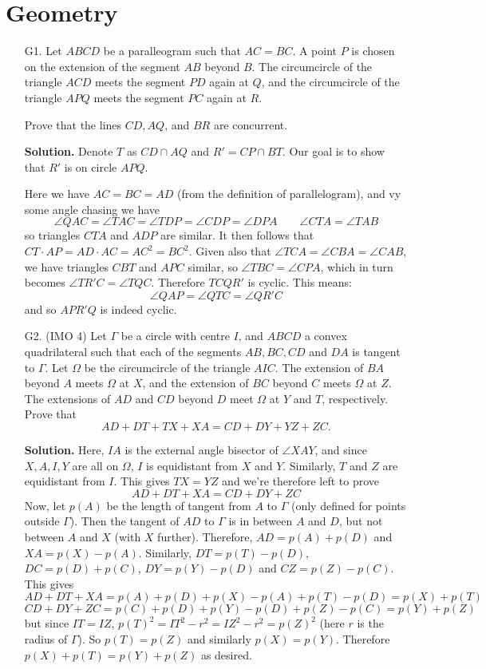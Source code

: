 \documentclass[11pt,a4paper]{article}
\begin{document}
	
	\section*{Geometry}
	\begin{enumerate}
		\item [G1.]  Let $ABCD$ be a paralleogram such that $AC = BC$. A point $P$ is chosen on the extension of the segment $AB$ beyond $B$. 
		The circumcircle of the triangle $ACD$ meets the segment $PD$ again at $Q$, and the circumcircle of the triangle $APQ$ meets the segment $PC$ again at $R$.
		
		Prove that the lines $CD, AQ$, and $BR$ are concurrent.
		
		\textbf{Solution.} 
		Denote $T$ as $CD\cap AQ$ and $R'=CP\cap BT$. Our goal is to show that $R'$ is on circle $APQ$. 
		 
		Here we have $AC=BC=AD$ (from the definition of parallelogram), and vy some angle chasing we have 
		\[
		\angle QAC = \angle TAC = \angle TDP = \angle CDP = \angle DPA
		\qquad 
		\angle CTA = \angle TAB
		\]
		so triangles $CTA$ and $ADP$ are similar. It then follows that $CT\cdot AP = AD\cdot AC = AC^2=BC^2$. 
		Given also that $\angle TCA = \angle CBA=\angle CAB$, we have triangles $CBT$ and $APC$ similar, so $\angle TBC = \angle CPA$, which in turn becomes 
		$\angle TR'C=\angle TQC$. Therefore $TCQR'$ is cyclic. 
		This means: 
		\[
		\angle QAP = \angle QTC = \angle QR'C
		\]
		and so $APR'Q$ is indeed cyclic. 
		
		\item [G2.] (IMO 4)
		Let $\Gamma$ be a circle with centre $I$, and $A B C D$ a convex quadrilateral such that each of the segments $A B, B C, C D$ and $D A$ is tangent to $\Gamma$. Let $\Omega$ be the circumcircle of the triangle $A I C$. The extension of $B A$ beyond $A$ meets $\Omega$ at $X$, and the extension of $B C$ beyond $C$ meets $\Omega$ at $Z$. The extensions of $A D$ and $C D$ beyond $D$ meet $\Omega$ at $Y$ and $T$, respectively. Prove that\[A D+D T+T X+X A=C D+D Y+Y Z+Z C.\]
		
		\textbf{Solution.} 
		Here, $IA$ is the external angle bisector of $\angle XAY$, and since $X, A, I, Y$ are all on $\Omega$, 
		$I$ is equidistant from $X$ and $Y$. 
		Similarly, 
		$T$ and $Z$ are equidistant from $I$. This gives $TX = YZ$ and we're therefore left to prove 
		\[
		A D+D T+X A=C D+D Y+Z C
		\]
		Now, let $p(A)$ be the length of tangent from $A$ to $\Gamma$ (only defined for points outside $\Gamma$). 
		Then the tangent of $AD$ to $\Gamma$ is in between $A$ and $D$, but not between $A$ and $X$ (with $X$ further).
		Therefore, $AD = p(A) + p(D)$ and $XA=p(X) - p(A)$. 
		Similarly, $DT = p(T) - p(D)$, $DC = p(D) + p(C)$, $DY = p(Y) - p(D)$ and $CZ = p(Z) - p(C)$. 
		This gives 
		\[
		A D+D T+X A
		=p(A) + p(D) + p(X) - p(A) + p(T) - p(D) = p(X) + p(T)
		\]\[
		C D+D Y+Z C
		=p(C) + p(D) + p(Y) - p(D) + p(Z) - p(C) = p(Y) + p(Z)
		\]
		but since $IT=IZ$, $p(T)^2 = IT^2 - r^2 = IZ^2 - r^2 = p(Z)^2$ (here $r$ is the radius of $\Gamma$). 
		So $p(T)=p(Z)$ and similarly $p(X)=p(Y)$. 
		Therefore $p(X) + p(T)=p(Y) + p(Z)$ as desired. 
		

\end{enumerate}
\end{document}
